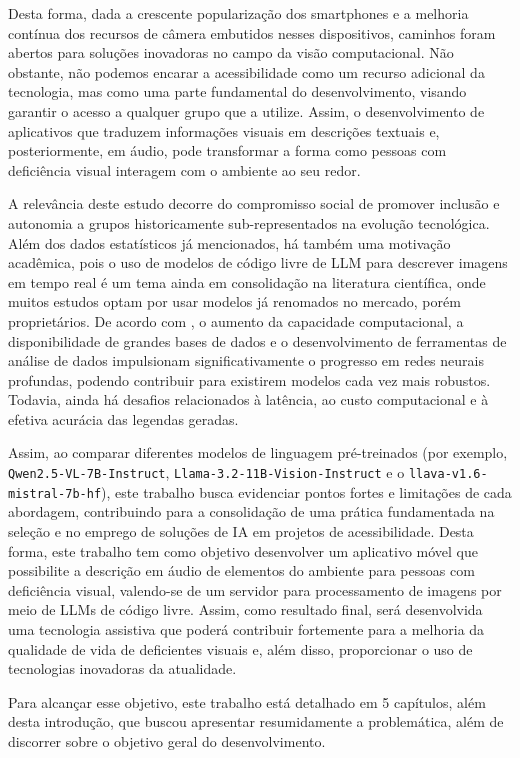 Desta forma, dada a crescente popularização dos smartphones e a melhoria contínua dos recursos de câmera embutidos nesses dispositivos, caminhos foram abertos para soluções inovadoras no campo da visão computacional. Não obstante, não podemos encarar a acessibilidade como um recurso adicional da tecnologia, mas como uma parte fundamental do desenvolvimento, visando garantir o acesso a qualquer grupo que a utilize. Assim, o desenvolvimento de aplicativos que traduzem informações visuais em descrições textuais e, posteriormente, em áudio, pode transformar a forma como pessoas com deficiência visual interagem com o ambiente ao seu redor.

A relevância deste estudo decorre do compromisso social de promover inclusão e autonomia a grupos historicamente sub-representados na evolução tecnológica. Além dos dados estatísticos já mencionados, há também uma motivação acadêmica, pois o uso de modelos de código livre de LLM para descrever imagens em tempo real é um tema ainda em consolidação na literatura científica, onde muitos estudos optam por usar modelos já renomados no mercado, porém proprietários. De acordo com , o aumento da capacidade computacional, a disponibilidade de grandes bases de dados e o desenvolvimento de ferramentas de análise de dados impulsionam significativamente o progresso em redes neurais profundas, podendo contribuir para existirem modelos cada vez mais robustos. Todavia, ainda há desafios relacionados à latência, ao custo computacional e à efetiva acurácia das legendas geradas.

Assim, ao comparar diferentes modelos de linguagem pré-treinados (por exemplo, \lstinline{Qwen2.5-VL-7B-Instruct}, \lstinline{Llama-3.2-11B-Vision-Instruct} e o \lstinline{llava-v1.6-mistral-7b-hf}), este trabalho busca evidenciar pontos fortes e limitações de cada abordagem, contribuindo para a consolidação de uma prática fundamentada na seleção e no emprego de soluções de IA em projetos de acessibilidade. Desta forma, este trabalho tem como objetivo desenvolver um aplicativo móvel que possibilite a descrição em áudio de elementos do ambiente para pessoas com deficiência visual, valendo-se de um servidor para processamento de imagens por meio de LLMs de código livre. Assim, como resultado final, será desenvolvida uma tecnologia assistiva que poderá contribuir fortemente para a melhoria da qualidade de vida de deficientes visuais e, além disso, proporcionar o uso de tecnologias inovadoras da atualidade.

Para alcançar esse objetivo, este trabalho está detalhado em 5 capítulos, além desta introdução, que buscou apresentar resumidamente a problemática, além de discorrer sobre o objetivo geral do desenvolvimento.

